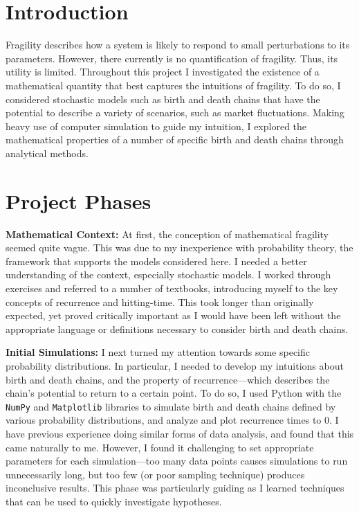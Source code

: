 \documentclass[12pt,letterpaper]{article}
\begin{document}
\section*{Introduction}
Fragility describes how a system is likely to respond to small perturbations to its parameters. However,
there currently is no quantification of fragility. Thus, its utility is limited. Throughout this project
I investigated the existence of a mathematical quantity that best captures the intuitions of fragility.
To do so, I considered stochastic models such as birth and death chains that have the potential to
describe a variety of scenarios, such as market fluctuations. Making heavy use of computer simulation to
guide my intuition, I explored the mathematical properties of a number of specific birth and death
chains through analytical methods.

\section*{Project Phases}
\noindent
\textbf{Mathematical Context:} At first, the conception of mathematical fragility seemed quite vague.
This was due to my inexperience with probability theory, the framework that supports the models
considered here. I needed a better understanding of the context, especially stochastic models. I worked
through exercises and referred to a number of textbooks, introducing myself to the key concepts of
recurrence and hitting-time. This took longer than originally expected, yet proved critically important
as I would have been left without the appropriate language or definitions necessary to consider birth
and death chains.

\noindent
\textbf{Initial Simulations:} I next turned my attention towards some specific probability
distributions. In particular, I needed to develop my intuitions about birth and death chains, and the
property of recurrence---which describes the chain's potential to return to a certain point. To do so, I
used Python with the \texttt{NumPy} and \texttt{Matplotlib} libraries to simulate birth and death chains
defined by various probability distributions, and analyze and plot recurrence times to $0$. I have
previous experience doing similar forms of data analysis, and found that this came naturally to me.
However, I found it challenging to set appropriate parameters for each simulation---too many data points
causes simulations to run unnecessarily long, but too few (or poor sampling technique) produces
inconclusive results. This phase was particularly guiding as I learned techniques that can be used to
quickly investigate hypotheses.
\end{document}
